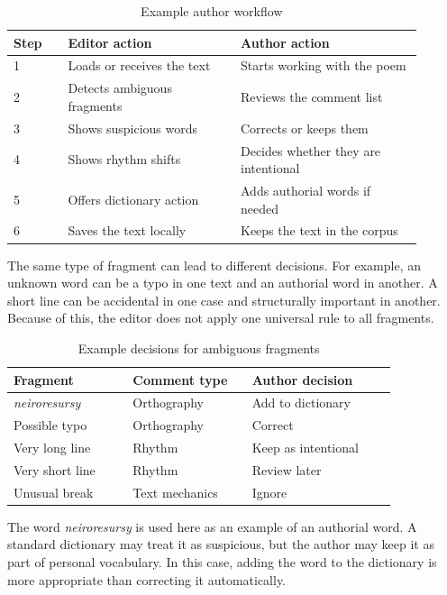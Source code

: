 \documentclass[sigconf]{acmart}
\begin{document}
\begin{table}[h]
\caption{Example author workflow}
\label{tab:workflow}
\begin{tabular}{p{0.12\linewidth}p{0.38\linewidth}p{0.40\linewidth}}
\toprule
Step & Editor action & Author action \\
\midrule
1 & Loads or receives the text & Starts working with the poem \\
2 & Detects ambiguous fragments & Reviews the comment list \\
3 & Shows suspicious words & Corrects or keeps them \\
4 & Shows rhythm shifts & Decides whether they are intentional \\
5 & Offers dictionary action & Adds authorial words if needed \\
6 & Saves the text locally & Keeps the text in the corpus \\
\bottomrule
\end{tabular}
\end{table}

The same type of fragment can lead to different decisions. For example, an unknown word can be a typo in one text and an authorial word in another. A short line can be accidental in one case and structurally important in another. Because of this, the editor does not apply one universal rule to all fragments.

\begin{table}[h]
\caption{Example decisions for ambiguous fragments}
\label{tab:example-decisions}
\begin{tabular}{p{0.28\linewidth}p{0.28\linewidth}p{0.34\linewidth}}
\toprule
Fragment & Comment type & Author decision \\
\midrule
\textit{neiroresursy} & Orthography & Add to dictionary \\
Possible typo & Orthography & Correct \\
Very long line & Rhythm & Keep as intentional \\
Very short line & Rhythm & Review later \\
Unusual break & Text mechanics & Ignore \\
\bottomrule
\end{tabular}
\end{table}

The word \textit{neiroresursy} is used here as an example of an authorial word. A standard dictionary may treat it as suspicious, but the author may keep it as part of personal vocabulary. In this case, adding the word to the dictionary is more appropriate than correcting it automatically.
\end{document}
